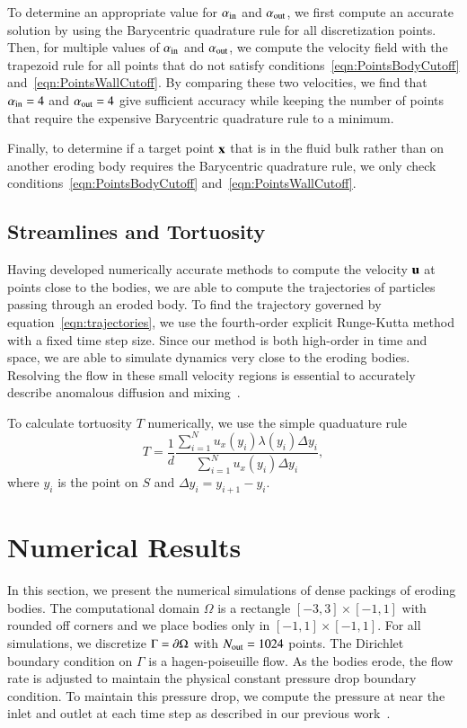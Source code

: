 \documentclass[preprint, 10pt]{elsarticle}
\begin{document}
To determine an appropriate value for $\alpha_{\mathrm{in}}$ and $\alpha_{\mathrm{out}}$,
we first compute an accurate solution by using the Barycentric
quadrature rule for all discretization points.  Then, for multiple
values of $\alpha_{\mathrm{in}}$ and $\alpha_{\mathrm{out}}$, we compute the velocity field
with the trapezoid rule for all points that do not satisfy
conditions~\eqref{eqn:PointsBodyCutoff}
and~\eqref{eqn:PointsWallCutoff}.  By comparing these two velocities, we
find that $\alpha_{\mathrm{in}} = 4$ and $\alpha_{\mathrm{out}} = 4$ give sufficient
accuracy while keeping the number of points that require the expensive
Barycentric quadrature rule to a minimum.

Finally, to determine if a target point ${\mathbf{x}}$ that is in the fluid bulk
rather than on another eroding body requires the Barycentric quadrature
rule, we only check conditions~\eqref{eqn:PointsBodyCutoff}
and~\eqref{eqn:PointsWallCutoff}.  


\subsection{Streamlines and Tortuosity}
\label{s:streamlines}
Having developed numerically accurate methods to compute the velocity
${\mathbf{u}}$ at points close to the bodies, we are able to compute the
trajectories of particles passing through an eroded body.  To find the
trajectory governed by equation~\eqref{eqn:trajectories}, we use the
fourth-order explicit Runge-Kutta method with a fixed time step size.
Since our method is both high-order in time and space, we are able to
simulate dynamics very close to the eroding bodies.  Resolving the flow
in these small velocity regions is essential to accurately describe
anomalous diffusion and mixing~\cite{leb-den-dav-bol-car-dec-bou2011}.

{\color{red}
To calculate tortuosity $T$ numerically, we use the simple quaduature
rule
$$T=\frac{1}{d}\frac{\displaystyle\sum_{i=1}^{N} u_x(y_i) \lambda(y_i) \Delta y_i}{\displaystyle\sum_{i=1}^{N} u_x(y_i) \Delta y_i},$$ 
where $y_i$ is the point on $S$ and $\Delta y_i = y_{i+1}-y_{i}$.}  


\section{Numerical Results}
\label{s:results}
In this section, we present the numerical simulations of dense packings
of eroding bodies.  The computational domain $\Omega$ is a rectangle
$[-3,3] \times [-1,1]$ with rounded off corners and we place bodies only
in $[-1,1] \times [-1,1]$.  For all simulations, we discretize $\Gamma =
{\partial} \Omega$ with $N_{\mathrm{out}}=1024$ points.  The Dirichlet boundary condition
on $\Gamma$ is a hagen-poiseuille flow.  As the bodies erode, the flow
rate is adjusted to maintain the physical constant pressure drop
boundary condition.  To maintain this pressure drop, we compute the
pressure at near the inlet and outlet at each time step as described in
our previous work~\cite{qua-moo2018}.
\end{document}
